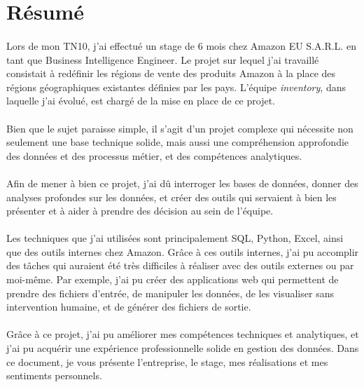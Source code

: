 \section*{Résumé}
\vspace{-2em}  %
\paragraph{}
Lors de mon TN10, j'ai effectué un stage de 6 mois chez Amazon EU S.A.R.L. en tant que Business Intelligence Engineer.
Le projet sur lequel j'ai travaillé consistait à redéfinir les régions de vente des produits Amazon à la place des régions géographiques existantes définies par les pays.
L'équipe \textit{inventory}, dans laquelle j'ai évolué, est chargé de la mise en place de ce projet.
\paragraph{}
\vspace{-2em}  %
Bien que le sujet paraisse simple, il s'agit d'un projet complexe qui nécessite
non seulement une base technique solide, mais aussi une compréhension approfondie des données et des processus métier, et des compétences analytiques.
\paragraph{}
\vspace{-2em}  %
Afin de mener à bien ce projet, j'ai dû interroger les bases de données, donner des analyses profondes sur les données, 
et créer des outils qui servaient à bien les présenter et à aider à prendre des décision au sein de l'équipe.
\paragraph{}
\vspace{-2em}  %
Les techniques que j'ai utilisées sont principalement SQL, Python, Excel, ainsi que des outils internes chez Amazon. 
Grâce à ces outils internes, j'ai pu accomplir des tâches qui auraient été très difficiles à réaliser avec des outils externes ou par moi-même. 
Par exemple, j'ai pu créer des applications web qui permettent de prendre des fichiers d'entrée, de manipuler les données, de les visualiser sans intervention humaine, et de générer des fichiers de sortie.
\paragraph{}
\vspace{-2em}  %
Grâce à ce projet, j'ai pu améliorer mes compétences techniques et analytiques, et j'ai pu acquérir une expérience professionnelle solide en gestion des données. Dans ce document, je vous présente l’entreprise, le stage, mes réalisations et mes
sentiments personnels.